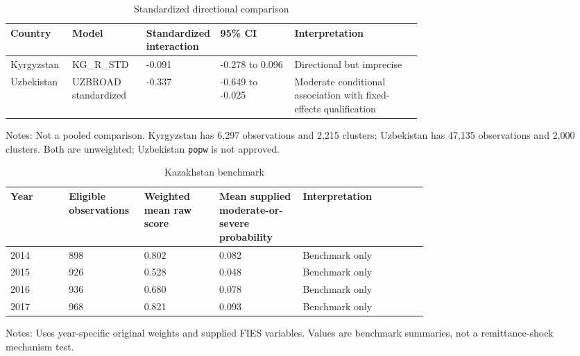 \documentclass[11pt]{article}
\begin{document}
\clearpage

\begin{table}[!htbp]
\centering
\caption{Standardized directional comparison}
\label{tab:standardized}
\footnotesize
\begin{tabularx}{\linewidth}{p{0.15\linewidth} p{0.18\linewidth} p{0.18\linewidth} p{0.18\linewidth} X}
\toprule
Country & Model & Standardized interaction & 95\% CI & Interpretation \\
\midrule
Kyrgyzstan & KG\_R\_STD & -0.091 & -0.278 to 0.096 & Directional but imprecise \\
Uzbekistan & UZBROAD standardized & -0.337 & -0.649 to -0.025 & Moderate conditional association with fixed-effects qualification \\
\bottomrule
\end{tabularx}
\begin{minipage}{0.95\linewidth}\footnotesize Notes: Not a pooled comparison. Kyrgyzstan has 6,297 observations and 2,215 clusters; Uzbekistan has 47,135 observations and 2,000 clusters. Both are unweighted; Uzbekistan \texttt{popw} is not approved.\end{minipage}
\end{table}

\clearpage

\begin{table}[!htbp]
\centering
\caption{Kazakhstan benchmark}
\label{tab:kazakhstan}
\footnotesize
\begin{tabularx}{\linewidth}{p{0.14\linewidth} p{0.18\linewidth} p{0.18\linewidth} p{0.20\linewidth} X}
\toprule
Year & Eligible observations & Weighted mean raw score & Mean supplied moderate-or-severe probability & Interpretation \\
\midrule
2014 & 898 & 0.802 & 0.082 & Benchmark only \\
2015 & 926 & 0.528 & 0.048 & Benchmark only \\
2016 & 936 & 0.680 & 0.078 & Benchmark only \\
2017 & 968 & 0.821 & 0.093 & Benchmark only \\
\bottomrule
\end{tabularx}
\begin{minipage}{0.95\linewidth}\footnotesize Notes: Uses year-specific original weights and supplied FIES variables. Values are benchmark summaries, not a remittance-shock mechanism test.\end{minipage}
\end{table}

\clearpage
\end{document}
